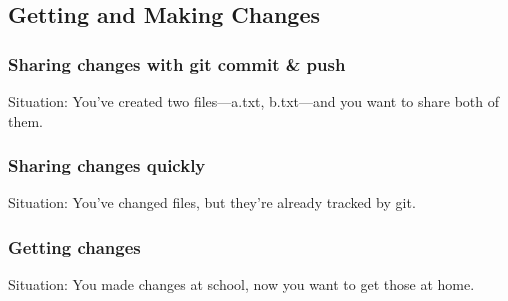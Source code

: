 \documentclass{beamer}
\begin{document}
\subsection[Getting and Making Changes]{Getting and Making Changes}

\begin{frame}
\frametitle{Sharing changes with git commit \& push}
\alert{Situation:} You've created two files---a.txt, b.txt---and you
want to share both of them.

\vspace{.05\textwidth}


\vspace{.05\textwidth}

\begin{enumerate}
\end{enumerate}
\end{frame}

\begin{frame}
\frametitle{Sharing changes quickly}
\alert{Situation:} You've changed files, but they're already tracked by git.

\vspace{.05\textwidth}


\vspace{.05\textwidth}
\begin{enumerate}
\end{enumerate}
\end{frame}

\begin{frame}
\frametitle{Getting changes}
\alert{Situation:} You made changes at school, now you want to get those at
home.

\vspace{.05\textwidth}


\vspace{.05\textwidth}
\begin{enumerate}
\end{enumerate}
\end{frame}
\end{document}

